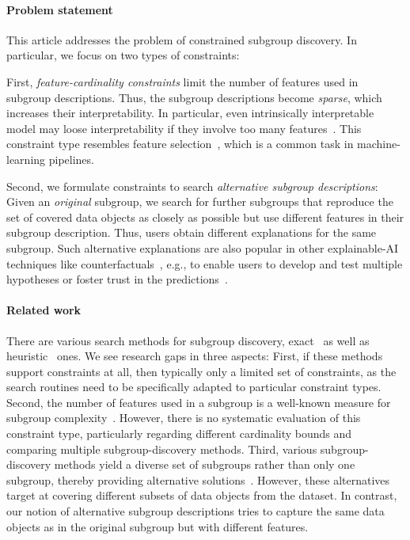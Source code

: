 \documentclass{article}
\theoremstyle{definition}
\begin{document}
\paragraph{Problem statement}

This article addresses the problem of constrained subgroup discovery.
In particular, we focus on two types of constraints:

First, \emph{feature-cardinality constraints} limit the number of features used in subgroup descriptions.
Thus, the subgroup descriptions become \emph{sparse}, which increases their interpretability.
In particular, even intrinsically interpretable model may loose interpretability if they involve too many features~\cite{molnar2020interpretable}.
This constraint type resembles feature selection~\cite{guyon2003introduction, li2017feature}, which is a common task in machine-learning pipelines.

Second, we formulate constraints to search \emph{alternative subgroup descriptions}:
Given an \emph{original} subgroup, we search for further subgroups that reproduce the set of covered data objects as closely as possible but use different features in their subgroup description.
Thus, users obtain different explanations for the same subgroup.
Such alternative explanations are also popular in other explainable-AI techniques like counterfactuals~\cite{mothilal2020explaining, russell2019efficient}, e.g., to enable users to develop and test multiple hypotheses or foster trust in the predictions~\cite{kim2021multi, wang2019designing}.

\paragraph{Related work}

There are various search methods for subgroup discovery, exact~\cite{bosc2018anytime, lemmerich2010fast, millot2020optimal} as well as heuristic~\cite{friedman1999bump, leeuwen2012diverse, mampaey2012efficient, proencca2022robust} ones.
We see research gaps in three aspects:
First, if these methods support constraints at all, then typically only a limited set of constraints, as the search routines need to be specifically adapted to particular constraint types.
Second, the number of features used in a subgroup is a well-known measure for subgroup complexity~\cite{helal2016subgroup, herrera2011overview, ventura2018subgroup}.
However, there is no systematic evaluation of this constraint type, particularly regarding different cardinality bounds and comparing multiple subgroup-discovery methods.
Third, various subgroup-discovery methods yield a diverse set of subgroups rather than only one subgroup, thereby providing alternative solutions~\cite{bosc2018anytime, lemmerich2010fast, leeuwen2012diverse, proencca2022robust}.
However, these alternatives target at covering different subsets of data objects from the dataset.
In contrast, our notion of alternative subgroup descriptions tries to capture the same data objects as in the original subgroup but with different features.
\end{document}
